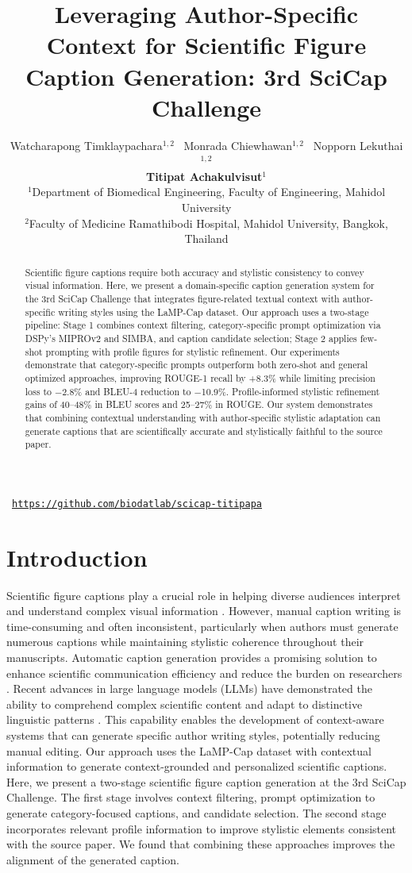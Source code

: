 \documentclass{article} %
\title{Leveraging Author-Specific Context for Scientific Figure \\ 
Caption Generation: 3rd SciCap Challenge }
\author{%
Watcharapong Timklaypachara$^{1,2}$ \,
Monrada Chiewhawan$^{1,2}$ \,
Nopporn Lekuthai$^{1,2}$ \\
\textbf{Titipat Achakulvisut$^{1}$} \\
$^1$Department of Biomedical Engineering, Faculty of Engineering, Mahidol University \\
$^2$Faculty of Medicine Ramathibodi Hospital, Mahidol University, Bangkok, Thailand
}
\begin{document}
\maketitle

\centerline{\faGithub\ \quad \href{github.com/biodatlab/scicap-titipapa}{\texttt{https://github.com/biodatlab/scicap-titipapa}}}
\vspace{1em}

\begin{abstract}

Scientific figure captions require both accuracy and stylistic consistency to convey visual information. Here, we present a domain-specific caption generation system for the 3rd SciCap Challenge that integrates figure-related textual context with author-specific writing styles using the LaMP-Cap dataset. Our approach uses a two-stage pipeline: Stage 1 combines context filtering, category-specific prompt optimization via DSPy's MIPROv2 and SIMBA, and caption candidate selection; Stage 2 applies few-shot prompting with profile figures for stylistic refinement. Our experiments demonstrate that category-specific prompts outperform both zero-shot and general optimized approaches, improving ROUGE-1 recall by +8.3\% while limiting precision loss to −2.8\% and BLEU-4 reduction to −10.9\%. Profile-informed stylistic refinement gains of 40–48\% in BLEU scores and 25–27\% in ROUGE. Our system demonstrates that combining contextual understanding with author-specific stylistic adaptation can generate captions that are scientifically accurate and stylistically faithful to the source paper.
\end{abstract}
\section{Introduction}
Scientific figure captions play a crucial role in helping diverse audiences interpret and understand complex visual information \citep{Lundgard2021}. However, manual caption writing is time-consuming and often inconsistent, particularly when authors must generate numerous captions while maintaining stylistic coherence throughout their manuscripts. Automatic caption generation provides a promising solution to enhance scientific communication efficiency and reduce the burden on researchers \citep{Hsu2021}. Recent advances in large language models (LLMs) have demonstrated the ability to comprehend complex scientific content and adapt to distinctive linguistic patterns \citep{Zanotto2024}. This capability enables the development of context-aware systems that can generate specific author writing styles, potentially reducing manual editing.  
Our approach uses the LaMP-Cap dataset with contextual information to generate context-grounded and personalized scientific captions. Here, we present a two-stage scientific figure caption generation at the 3rd SciCap Challenge. The first stage involves context filtering,  prompt optimization to generate category-focused captions, and candidate selection. The second stage incorporates relevant profile information to improve stylistic elements consistent with the source paper. We found that combining these approaches improves the alignment of the generated caption.
\end{document}
